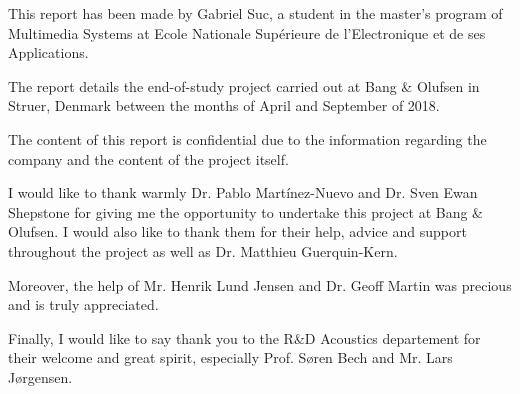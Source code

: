 \documentclass[
11pt, %
english, %
singlespacing, %
headsepline, %
]{MastersDoctoralThesis} %
\begin{document}


\begin{preface}
	\addchaptertocentry{\prefacename} %
	
	This report has been made by Gabriel Suc, a student in the master's program of Multimedia Systems at Ecole Nationale Supérieure de l'Electronique et de ses Applications. 
	
	The report details the end-of-study project carried out at Bang \& Olufsen in Struer, Denmark between the months of April and September of 2018. 
	
	The content of this report is confidential due to the information regarding the company and the content of the project itself.
	
\end{preface}


\begin{acknowledgements}
\addchaptertocentry{\acknowledgementname} %

I would like to thank warmly Dr. Pablo Martínez-Nuevo and Dr. Sven Ewan Shepstone for giving me the opportunity to undertake this project at Bang \& Olufsen. I would also like to thank them for their help, advice and support throughout the project as well as Dr. Matthieu Guerquin-Kern.

Moreover, the help of Mr. Henrik Lund Jensen and Dr. Geoff Martin was precious and is truly appreciated.

Finally, I would like to say thank you to the R\&D Acoustics departement for their welcome and great spirit, especially Prof. Søren Bech and Mr. Lars Jørgensen.

\end{acknowledgements}
\end{document}
